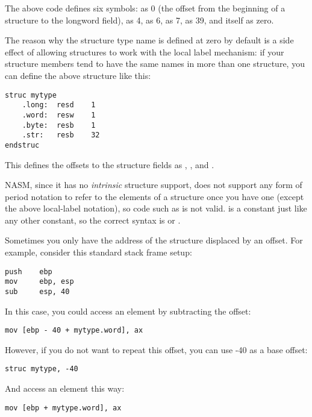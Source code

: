 The above code defines six symbols:  as 0 (the offset
from the beginning of a  structure to the longword field),
 as 4,  as 6,  as 7,
 as 39, and  itself as zero.

The reason why the structure type name is defined at zero by default
is a side effect of allowing structures to work with the local label
mechanism: if your structure members tend to have the same names in
more than one structure, you can define the above structure like this:

\begin{lstlisting}
struc mytype
    .long:  resd    1
    .word:  resw    1
    .byte:  resb    1
    .str:   resb    32
endstruc
\end{lstlisting}

This defines the offsets to the structure fields as ,
,  and .

NASM, since it has no \emph{intrinsic} structure support, does not
support any form of period notation to refer to the elements of a
structure once you have one (except the above local-label notation),
so code such as  is not valid.
 is a constant just like any other constant, so the
correct syntax is  or
.

Sometimes you only have the address of the structure displaced by an
offset. For example, consider this standard stack frame setup:

\begin{lstlisting}
push    ebp
mov     ebp, esp
sub     esp, 40
\end{lstlisting}

In this case, you could access an element by subtracting the offset:

\begin{lstlisting}
mov [ebp - 40 + mytype.word], ax
\end{lstlisting}

However, if you do not want to repeat this offset, you can use -40 as
a base offset:

\begin{lstlisting}
struc mytype, -40
\end{lstlisting}

And access an element this way:

\begin{lstlisting}
mov [ebp + mytype.word], ax
\end{lstlisting}

